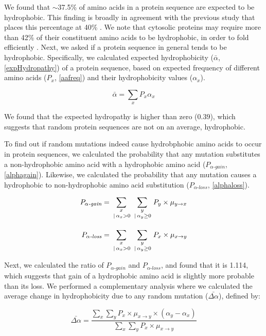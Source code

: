 \documentclass[12pt,a4paper]{article}
\begin{document}
We found that $\sim$37.5\% of amino acids in a protein sequence are expected to be hydrophobic. This finding is broadly in agreement with the previous study that places this percentage at 40\% \citep{hydrophobicRatchet}. We note that cytosolic proteins may require more than 42\% of their constituent amino acids to be hydrophobic, in order to fold efficiently \citep{Dill1985}. Next, we asked if a protein sequence in general tends to be hydrophobic. Specifically, we calculated expected hydrophobicity ($\bar{\alpha}$, \autoref{expHydropathy}) of a protein sequence, based on expected frequency of different amino acids ($P_x$, \autoref{aafreq}) and their hydrophobicity values ($\alpha_x$). 

\begin{equation}
\bar{\alpha} = \sum_{x} P_x \alpha_x
\label{expHydropathy}
\end{equation}


We found that the expected hydropathy is higher than zero ($0.39$), which suggests that random protein sequences are not on an average, hydrophobic.
 
To find out if random mutations indeed cause hydrobphobic amino acids to occur in protein sequences, we calculated the probability that any mutation substitutes a non-hydrophobic amino acid with a hydrophobic amino acid ($P_{\alpha\textit{-gain}}$, \autoref{alphagain}). Likewise, we calculated the probability that any mutation causes a hydrophobic to non-hydrophobic amino acid substitution ($P_{\alpha\textit{-loss}}$, \autoref{alphaloss}).  

\begin{align}
P_{\alpha\textit{-gain}} & = \sum_{\genfrac{}{}{0pt}{1}{x}{\,|\,\alpha_x>0}} \sum_{\genfrac{}{}{0pt}{1}{y}{\,|\,\alpha_y \geq 0}} P_y \times \mu_{y\to x}\label{alphagain}\\[1em]
%
P_{\alpha\textit{-loss}} &= \sum_{\genfrac{}{}{0pt}{1}{x}{\,|\,\alpha_x>0}} \sum_{\genfrac{}{}{0pt}{1}{y}{\,|\,\alpha_y \geq 0}} P_x \times \mu_{x\to y}\label{alphaloss}
\end{align}

Next, we calculated the ratio of $P_{\alpha\textit{-gain}}$ and $P_{\alpha\textit{-loss}}$, and found that it is 1.114, which suggests that gain of a hydrophobic amino acid is slightly more probable than its loss. We performed a complementary analysis where we calculated the average change in hydrophobicity due to any random mutation ($\bar{\Delta\alpha}$), defined by:

\begin{equation}
\bar{\Delta\alpha} = \frac{\displaystyle\sum_{x} \sum_{y} P_x \times \mu_{x\to y} \times (\alpha_y - \alpha_x)}{\displaystyle\sum_{x} \sum_{y} P_x \times \mu_{x\to y}}
\end{equation}
\end{document}
